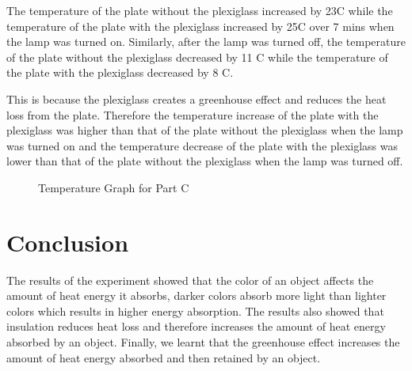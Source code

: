 \documentclass[a4paper, 12pt, english]{article}
\begin{document}
The temperature of the plate without the plexiglass increased by 23\degree C
while the temperature of the plate with the plexiglass increased by 25\degree C
over 7 mins when the lamp was turned on. Similarly, after the lamp was turned
off, the temperature of the plate without the plexiglass decreased by 11\degree
C while the temperature of the plate with the plexiglass decreased by 8\degree
C.

This is because the plexiglass creates a greenhouse effect and reduces the heat
loss from the plate. Therefore the temperature increase of the plate with the
plexiglass was higher than that of the plate without the plexiglass when the
lamp was turned on and the temperature decrease of the plate with the
plexiglass was lower than that of the plate without the plexiglass when the
lamp was turned off.

\begin{figure}[H]
\centering
{}
\caption{Temperature Graph for Part C}
\end{figure}

\section{Conclusion}
The results of the experiment showed that the color of an object affects the
amount of heat energy it absorbs, darker colors absorb more light than lighter
colors which results in higher energy absorption. The results also showed that
insulation reduces heat loss and therefore increases the amount of heat energy
absorbed by an object. Finally, we learnt that the greenhouse effect increases
the amount of heat energy absorbed and then retained by an object.
\end{document}

